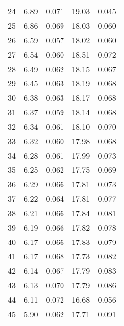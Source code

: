\begin{table}
\begin{tabular}{c|ll|ll}
24 & 6.89 & 0.071 & 19.03 & 0.045 \\
25 & 6.86 & 0.069 & 18.03 & 0.060 \\
26 & 6.59 & 0.057 & 18.02 & 0.060 \\
27 & 6.54 & 0.060 & 18.51 & 0.072 \\
28 & 6.49 & 0.062 & 18.15 & 0.067 \\
29 & 6.45 & 0.063 & 18.19 & 0.068 \\
30 & 6.38 & 0.063 & 18.17 & 0.068 \\
31 & 6.37 & 0.059 & 18.14 & 0.068 \\
32 & 6.34 & 0.061 & 18.10 & 0.070 \\
33 & 6.32 & 0.060 & 17.98 & 0.068 \\
34 & 6.28 & 0.061 & 17.99 & 0.073 \\
35 & 6.25 & 0.062 & 17.75 & 0.069 \\
36 & 6.29 & 0.066 & 17.81 & 0.073 \\
37 & 6.22 & 0.064 & 17.81 & 0.077 \\
38 & 6.21 & 0.066 & 17.84 & 0.081 \\
39 & 6.19 & 0.066 & 17.82 & 0.078 \\
40 & 6.17 & 0.066 & 17.83 & 0.079 \\
41 & 6.17 & 0.068 & 17.73 & 0.082 \\
42 & 6.14 & 0.067 & 17.79 & 0.083 \\
43 & 6.13 & 0.070 & 17.79 & 0.086 \\
44 & 6.11 & 0.072 & 16.68 & 0.056 \\
45 & 5.90 & 0.062 & 17.71 & 0.091 \\
               \hline
        \end{tabular}
    \end{table}
    \clearpage

